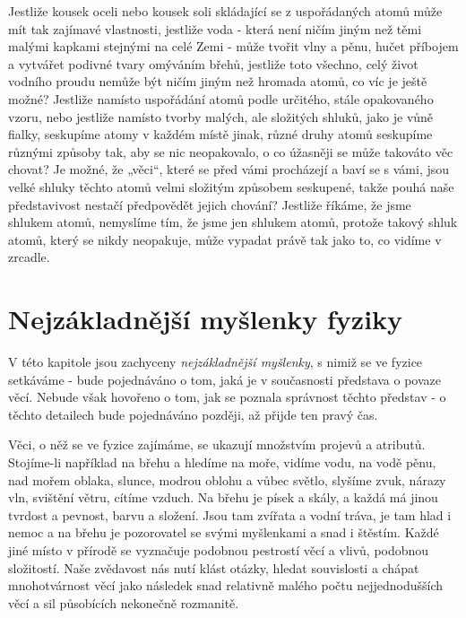 {      Jestliže kousek oceli nebo kousek soli skládající se z uspořádaných atomů může mít tak 
      zajímavé vlastnosti, jestliže voda - která není ničím jiným než těmi malými kapkami stejnými 
      na celé Zemi - může tvořit vlny a pěnu, hučet příbojem a vytvářet podivné tvary omýváním 
      břehů, jestliže toto všechno, celý život vodního proudu nemůže být ničím jiným než hromada 
      atomů, co víc je ještě možné? Jestliže namísto uspořádání atomů podle určitého, stále 
      opakovaného vzoru, nebo jestliže namísto tvorby malých, ale složitých shluků, jako je vůně 
      fialky, seskupíme atomy v každém místě jinak, různé druhy atomů seskupíme různými způsoby 
      tak, aby se nic neopakovalo, o co úžasněji se může takováto věc chovat? Je možné, že „věci“, 
      které se před vámi procházejí a baví se s vámi, jsou velké shluky těchto atomů velmi složitým 
      způsobem seskupené, takže pouhá naše představivost nestačí předpovědět jejich chování? 
      Jestliže říkáme, že jsme shlukem atomů, nemyslíme tím, že jsme jen shlukem atomů, protože 
      takový shluk atomů, který se nikdy neopakuje, může vypadat právě tak jako to, co vidíme v 
      zrcadle.
            
  \section{Nejzákladnější myšlenky fyziky}\label{fyz:IchapIsecII}
    V této kapitole jsou zachyceny \emph{nejzákladnější myšlenky}, s nimiž se ve fyzice setkáváme - 
    bude pojednáváno o tom, jaká je v současnosti představa o povaze věcí. Nebude však hovořeno o 
    tom, jak se poznala správnost těchto představ - o těchto detailech bude pojednáváno později, až 
    přijde ten pravý čas.

    Věci, o něž se ve fyzice zajímáme, se ukazují množstvím projevů a atributů. Stojíme-li 
    například na břehu a hledíme na moře, vidíme vodu, na vodě pěnu, nad mořem oblaka, slunce, 
    modrou oblohu a vůbec světlo, slyšíme zvuk, nárazy vln, svištění větru, cítíme vzduch. Na břehu 
    je písek a skály, a každá má jinou tvrdost a pevnost, barvu a složení. Jsou tam zvířata a vodní 
    tráva, je tam hlad i nemoc a na břehu je pozorovatel se svými myšlenkami a snad i štěstím. 
    Každé jiné místo v přírodě se vyznačuje podobnou pestrostí věcí a vlivů, podobnou složitostí. 
    Naše zvědavost nás nutí klást otázky, hledat souvislosti a chápat mnohotvárnost věcí jako 
    následek snad relativně malého počtu nejjednodušších věcí a sil působících nekonečně rozmanitě.
    
}
